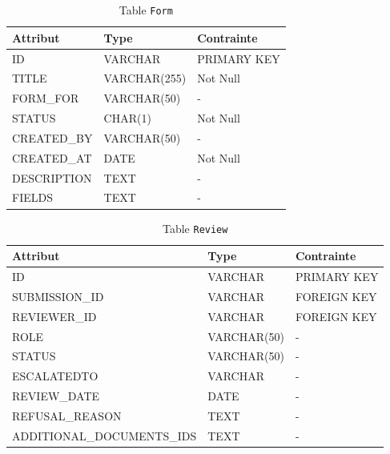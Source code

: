 \begin{table}[h!]
\centering
\begin{tabular}{|l|l|l|}
\hline
\textbf{Attribut} & \textbf{Type} & \textbf{Contrainte} \\
\hline
ID & VARCHAR & PRIMARY KEY \\
TITLE & VARCHAR(255) & Not Null \\
FORM\_FOR & VARCHAR(50) & - \\
STATUS & CHAR(1) & Not Null \\
CREATED\_BY & VARCHAR(50) & - \\
CREATED\_AT & DATE & Not Null \\
DESCRIPTION & TEXT & - \\
FIELDS & TEXT & - \\
\hline
\end{tabular}
\caption{Table \texttt{Form}}
\end{table}
\begin{table}[h!]
\centering
\begin{tabular}{|l|l|l|}
\hline
\textbf{Attribut} & \textbf{Type} & \textbf{Contrainte} \\
\hline
ID & VARCHAR & PRIMARY KEY \\
SUBMISSION\_ID & VARCHAR & FOREIGN KEY \\
REVIEWER\_ID & VARCHAR & FOREIGN KEY \\
ROLE & VARCHAR(50) & - \\
STATUS & VARCHAR(50) & - \\
ESCALATEDTO & VARCHAR & - \\
REVIEW\_DATE & DATE & - \\
REFUSAL\_REASON & TEXT & - \\
ADDITIONAL\_DOCUMENTS\_IDS & TEXT & - \\
\hline
\end{tabular}
\caption{Table \texttt{Review}}
\end{table}

